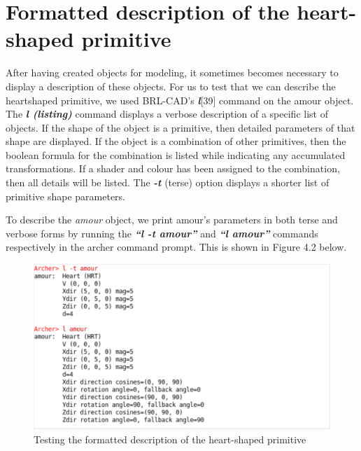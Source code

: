\section{Formatted description of the heart­-shaped primitive}

After   having   created   objects   for   modeling,   it   sometimes   becomes  
necessary   to   display   a   description   of   these   objects.   For   us   to   test   that   we   can  
describe   the   heart­shaped   primitive,   we   used   BRL-­CAD's   \textit{\textbf{l}}[39]   command   on  
the   amour   object.   The   \textit{\textbf{l (listing)}}   command   displays   a   verbose   description   of   a
 specific   list   of   objects.   If   the   shape   of   the   object   is   a   primitive,   then   detailed  
parameters   of   that   shape   are   displayed.   If   the   object   is   a   combination   of   other  
primitives,   then   the   boolean   formula   for   the   combination   is   listed   while   indicating  
any   accumulated   transformations.   If   a   shader   and   colour   has   been   assigned   to  
the   combination,   then   all   details   will   be   listed.   The   \textit{\textbf{-­t}}   (terse)   option   displays   a  
shorter list of primitive shape parameters.

\hspace{30} To   describe   the   \textit{amour}   object,   we   print   amour's   parameters   in   both   terse  
and   verbose   forms   by   running   the   \textit{\textbf{“l -t amour”}}   and   \textit{\textbf{“l amour”}}   commands  
respectively in the archer command prompt. This is shown in Figure 4.2 below.

\begin{figure}[htbp]
\centering
\includegraphics[trim=0.0cm 0.5cm 0.1cm 0.1cm, clip=true, totalheight=0.4\textheight]{Pictures/Describe.png}
\caption[Testing the formatted description of the heart­-shaped primitive]{Testing the formatted description of the heart­-shaped primitive}
\label{Describe}
\end{figure}


